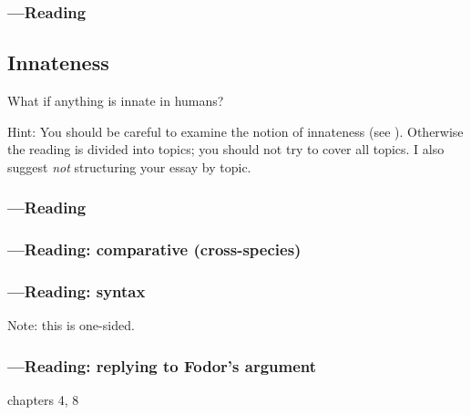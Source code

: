 \documentclass[12pt,\papersize]{extarticle}
\begin{document}
\subsubsection{---Reading}





\subsection{Innateness}
What if anything is innate in humans?

Hint: You should be careful to examine the notion of innateness  (see \citealp{Samuels:2004ho}).  Otherwise the reading is divided into topics; you should not try to cover all topics.  I also suggest \emph{not} structuring your essay by topic.

\subsubsection{---Reading}


\subsubsection{---Reading: comparative (cross-species)}




\subsubsection{---Reading: syntax}

Note: this is one-sided.  






\subsubsection{---Reading: replying to Fodor’s argument}


 chapters 4, 8
\end{document}
